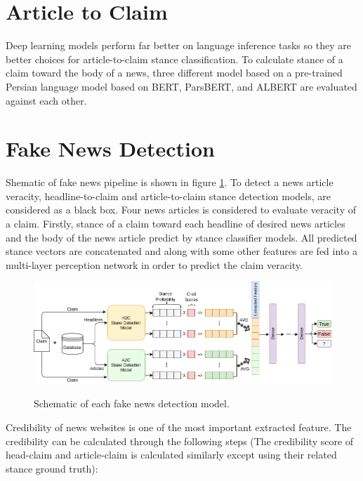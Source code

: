 \section{Article to Claim}
Deep learning models perform far better on language inference tasks so they are better choices for article-to-claim stance classification. To calculate stance of a claim toward the body of a news, three different model based on a pre-trained Persian language model based on BERT, ParsBERT, and  ALBERT are evaluated against each other. 

\section{Fake News Detection}
	\label{sec:fakenews}
Shematic of fake news pipeline is shown in figure \ref{fig:fnschm}. To detect a news article veracity, headline-to-claim and article-to-claim stance detection models, are considered as a black box. Four news articles is considered to evaluate veracity of a claim. Firstly, stance of a claim toward each headline of desired news articles and the body of the news article predict by stance classifier models. All predicted stance vectors are concatenated and along with some other features are fed into a multi-layer perception network in order to predict the claim veracity.

\begin{figure}%
	\centering
	{\includegraphics[width=14.5cm]{statistics/schema/fn.png} }
	\caption{Schematic of each fake news detection model.}%
	\label{fig:fnschm}%
\end{figure}

Credibility of news websites is one of the most important extracted feature. The credibility can be calculated through the following steps (The credibility score of head-claim and article-claim is calculated similarly except using their related stance ground truth):

